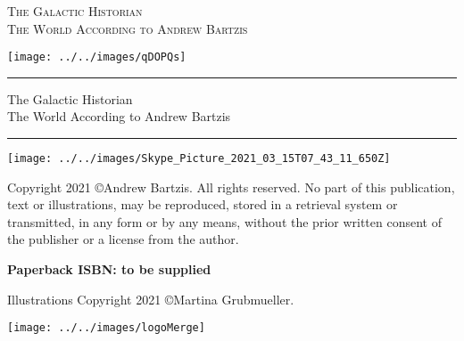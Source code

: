 \documentclass[letterpaper,10.5pt,twoside,onecolumn,openany]{book}
\begin{document}
	
	
	
	\newpage
	\thispagestyle{empty}
	
	
	\begin{center}
		\huge{\textsc{The Galactic Historian}}\\
		\large{\textsc{The World According to Andrew Bartzis}}
	\end{center}

	\vspace{15mm}

	
	\begin{center}
		\texttt{[image: ../../images/qDOPQs]}
	\end{center}
	
	
	
	
	
	\newpage
	\thispagestyle{empty}
	\hrule
	
	\begin{center}
		
		
		
		\large{The Galactic Historian\\
			The World According to Andrew Bartzis}
		
	\end{center}
	
	\hrule
	
	\begin{center}
		\texttt{[image: ../../images/Skype\_Picture\_2021\_03\_15T07\_43\_11\_650Z]}
	\end{center}
	
	
	
	\begin{center}
		\noindent
		\small{Copyright 2021  \copyright Andrew Bartzis. All rights reserved.
			No part of this publication, text or illustrations, may be reproduced, stored in a retrieval system or transmitted, in any form or by any means, without the prior written consent of the publisher or a license from the author.}
		
		\textbf{Paperback ISBN: to be supplied}
		
		
		
		
		\small{Illustrations Copyright 2021  \copyright Martina Grubmueller.}
		
	\end{center}
	
	\vspace{5mm}
	
	
	\begin{center}
		\texttt{[image: ../../images/logoMerge]}
	\end{center}
	
\end{document}
